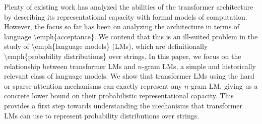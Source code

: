 Plenty of existing work has analyzed the abilities of the transformer architecture by describing its representational capacity with formal models of computation.     However, the focus so far has been on analyzing the architecture in terms of language \textbackslash{}emph\{acceptance\}.     We contend that this is an ill-suited problem in the study of \textbackslash{}emph\{language models\} (LMs), which are definitionally \textbackslash{}emph\{probability distributions\} over strings.     In this paper, we focus on the relationship between transformer LMs and $n$-gram LMs, a simple and historically relevant class of language models.      We show that transformer LMs using the hard or sparse attention mechanisms can exactly represent any $n$-gram LM, giving us a concrete lower bound on their probabilistic representational capacity.     This provides a first step towards understanding the mechanisms that transformer LMs can use to represent probability distributions over strings.